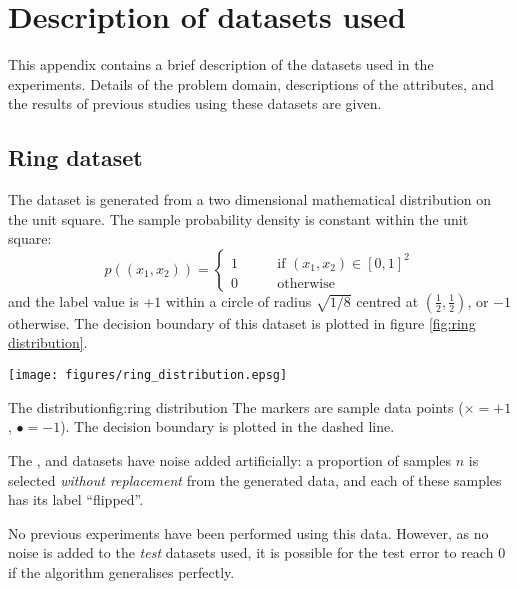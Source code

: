 
\chapter{Description of datasets used}
\label{appendix:datasets}

This appendix contains a brief description of the datasets used in the
experiments.  Details of the problem domain, descriptions of the
attributes, and the results of previous studies using these datasets
are given.

\section{Ring dataset}

The  dataset is generated from a two dimensional mathematical
distribution on the unit square.  The sample probability density is
constant within the unit square:
%
\begin{equation}
p((x_1, x_2)) = \left\{ \begin{array}{rr}
1	& \qquad \mbox{if $(x_1, x_2) \in [0,1]^2$} \\
0	& \qquad \mbox{otherwise}
\end{array} \right.
\end{equation}
%
and the label value is $+1$ within a circle of radius $\sqrt{1/8}$
centred at $(\frac{1}{2},\frac{1}{2})$, or $-1$ otherwise.  The
decision boundary of this dataset is plotted in figure \ref{fig:ring
distribution}.

\begin{linefigure}
\begin{center}
\texttt{[image: figures/ring\_distribution.epsg]}
\end{center}
\begin{capt}{The  distribution}{fig:ring distribution}
The markers are sample data points ($\times=+1$, $\bullet=-1$).  The
decision boundary is plotted in the dashed line.
\end{capt}
\end{linefigure}

The ,  and  datasets have noise added
artificially: a proportion of samples $n$ is selected \emph{without
replacement} from the generated data, and each of these samples has
its label ``flipped''.

No previous experiments have been performed using this data.  However,
as no noise is added to the \emph{test} datasets used, it is possible
for the test error to reach 0 if the algorithm generalises perfectly.

